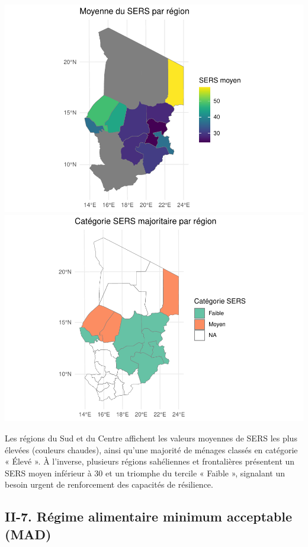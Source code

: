 \documentclass[
]{article}
\begin{document}
\includegraphics{Rapport_PAN_files/figure-latex/sers_map-1.pdf}
\includegraphics{Rapport_PAN_files/figure-latex/sers_map-2.pdf}

Les régions du Sud et du Centre affichent les valeurs moyennes de SERS
les plus élevées (couleurs chaudes), ainsi qu'une majorité de ménages
classés en catégorie « Élevé ». À l'inverse, plusieurs régions
sahéliennes et frontalières présentent un SERS moyen inférieur à 30 et
un triomphe du tercile « Faible », signalant un besoin urgent de
renforcement des capacités de résilience.

\hypertarget{ii-7.-ruxe9gime-alimentaire-minimum-acceptable-mad}{%
\subsection{II-7. Régime alimentaire minimum acceptable
(MAD)}\label{ii-7.-ruxe9gime-alimentaire-minimum-acceptable-mad}}
\end{document}
